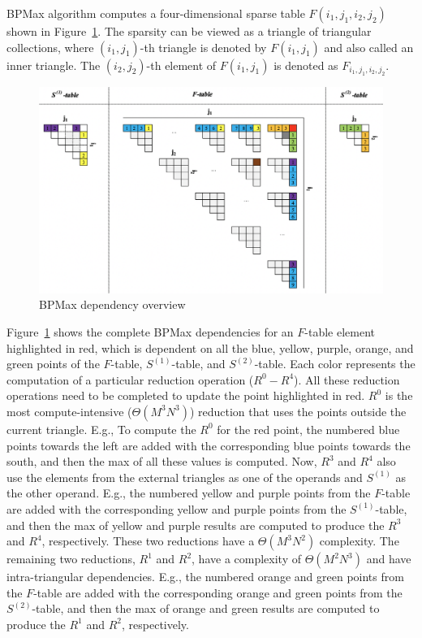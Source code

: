 BPMax algorithm computes a four-dimensional sparse table $F(i_{1}, j_{1}, i_{2}, j_{2})$ shown in Figure~\ref{fig:bpmax_dependency}. The sparsity can be viewed as a triangle of triangular collections, where  $(i_{1}, j_{1})$-th triangle is denoted by $F(i_{1}, j_{1})$ and also called an inner triangle. The $(i_{2}, j_{2})$-th element of $F(i_{1}, j_{1})$ is denoted as  $F_{i_{1}, j_{1}, i_{2}, j_{2}}$.  
\begin{figure}[htbp]
\centerline{\includegraphics[scale=.30]{content/figures/bpm_dependency.png}}
\caption{BPMax dependency overview}
\label{fig:bpmax_dependency}
\end{figure}
Figure~\ref{fig:bpmax_dependency} shows the complete BPMax dependencies for an $F$-table element highlighted in red, which is dependent on all the blue, yellow, purple, orange, and green points of the $F$-table, $S^{(1)}$-table,  and $S^{(2)}$-table. Each color represents the computation of a particular reduction operation ($R^{0} - R^{4}$). %
All these reduction operations need to be completed to update the point highlighted in red. $R^{0}$ is the most compute-intensive ($\Theta({M^3N^3})$) reduction that uses the points outside the current triangle. E.g., To compute the $R^{0}$ for the red point,  the numbered blue points towards the left are added with the corresponding blue points towards the south, and then the max of all these values is computed. Now, $R^{3}$ and $R^{4}$ also use the elements from the external triangles as one of the operands and  $S^{(1)}$ as the other operand. E.g., the numbered yellow and purple points from the $F$-table are added with the corresponding yellow and purple points from the $S^{(1)}$-table, and then the max of yellow and purple results are computed to produce the $R^{3}$ and $R^{4}$, respectively. These two reductions have a $\Theta(M^3N^2)$ complexity. The remaining two reductions, $R^{1}$ and $R^{2}$, have a complexity of $\Theta(M^2N^3)$ and have intra-triangular dependencies. E.g., the numbered orange and green points from the $F$-table are added with the corresponding orange and green points from the $S^{(2)}$-table, and then the max of orange and green results are computed to produce the $R^{1}$ and $R^{2}$, respectively.



